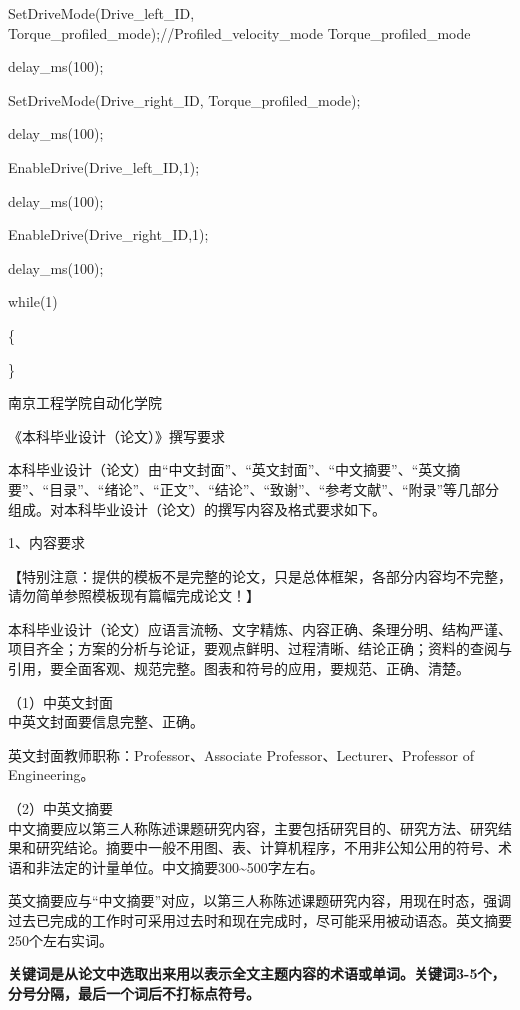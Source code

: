 \documentclass[UTF8,zihao=-4,openany,oneside]{ctexbook}
\begin{document}
SetDriveMode(Drive\_left\_ID, Torque\_profiled\_mode);//Profiled\_velocity\_mode Torque\_profiled\_mode

delay\_ms(100);

SetDriveMode(Drive\_right\_ID, Torque\_profiled\_mode);

delay\_ms(100);

EnableDrive(Drive\_left\_ID,1);

delay\_ms(100);

EnableDrive(Drive\_right\_ID,1);

delay\_ms(100);

while(1)

\{

\}

南京工程学院自动化学院

《本科毕业设计（论文）》撰写要求

本科毕业设计（论文）由“中文封面”、“英文封面”、“中文摘要”、“英文摘要”、“目录”、“绪论”、“正文”、“结论”、“致谢”、“参考文献”、“附录”等几部分组成。对本科毕业设计（论文）的撰写内容及格式要求如下。

1、内容要求

【特别注意：提供的模板不是完整的论文，只是总体框架，各部分内容均不完整，请勿简单参照模板现有篇幅完成论文！】

本科毕业设计（论文）应语言流畅、文字精炼、内容正确、条理分明、结构严谨、项目齐全；方案的分析与论证，要观点鲜明、过程清晰、结论正确；资料的查阅与引用，要全面客观、规范完整。图表和符号的应用，要规范、正确、清楚。

\noindent （1）中英文封面\\

中英文封面要信息完整、正确。

英文封面教师职称：Professor、Associate Professor、Lecturer、Professor of Engineering。

\noindent （2）中英文摘要\\

中文摘要应以第三人称陈述课题研究内容，主要包括研究目的、研究方法、研究结果和研究结论。摘要中一般不用图、表、计算机程序，不用非公知公用的符号、术语和非法定的计量单位。中文摘要300\textasciitilde{}500字左右。

英文摘要应与“中文摘要”对应，以第三人称陈述课题研究内容，用现在时态，强调过去已完成的工作时可采用过去时和现在完成时，尽可能采用被动语态。英文摘要250个左右实词。

\noindent\textbf{关键词是从论文中选取出来用以表示全文主题内容的术语或单词。关键词3-5个，分号分隔，最后一个词后不打标点符号。}
\end{document}
